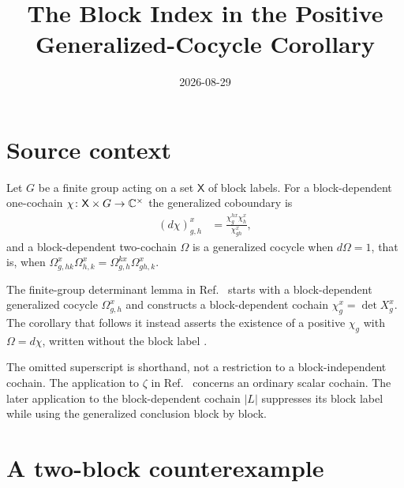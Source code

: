 \documentclass{article}
\title{The Block Index in the Positive Generalized-Cocycle Corollary}
\author{}
\date{2026-08-29}
\begin{document}
\maketitle
{}

\section{Source context}

Let $G$ be a finite group acting on a set $\mathsf X$ of block labels. For a
block-dependent one-cochain $\chi\colon\mathsf X\times G\to\mathbb{C}^\times$ the
generalized coboundary is
\begin{align}
    (d\chi)^x_{g,h}
        &=\frac{\chi^{h x}_g\chi^x_h}{\chi^x_{gh}},
    \label{eq:fbc25_positive_block_index_coboundary}
\end{align}
and a block-dependent two-cochain $\Omega$ is a generalized cocycle when
$d\Omega=1$, that is, when
$\Omega^x_{g,hk}\Omega^x_{h,k}=\Omega^{k x}_{g,h}\Omega^x_{gh,k}$.

The finite-group determinant lemma in
Ref.~\cite[lines~5931--5947]{FrancoRubio2025MPUGauging} starts with a
block-dependent generalized cocycle $\Omega^x_{g,h}$ and constructs a
block-dependent cochain $\chi^x_g=\det X^x_g$. The corollary that follows it
instead asserts the existence of a positive $\chi_g$ with $\Omega=d\chi$,
written without the block label
\cite[Corollary~\texttt{cor:positive\_trivial}, lines~5950--5952]
{FrancoRubio2025MPUGauging}.

The omitted superscript is shorthand, not a restriction to a block-independent
cochain. The application to $\zeta$ in
Ref.~\cite[line~6018]{FrancoRubio2025MPUGauging} concerns an ordinary scalar
cochain. The later application to the block-dependent cochain $|L|$
\cite[lines~6023--6029]{FrancoRubio2025MPUGauging} suppresses its block label
while using the generalized conclusion block by block.

\section{A two-block counterexample}
\end{document}

